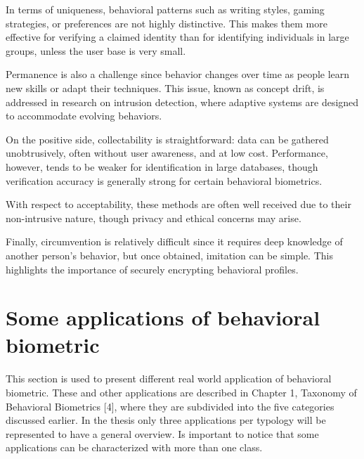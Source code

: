 \documentclass[12pt]{report}
\begin{document}
In terms of uniqueness, behavioral patterns such as writing styles, gaming strategies, or preferences are not highly distinctive.
This makes them more effective for verifying a claimed identity than for identifying individuals in large groups, unless the user base is very small.

Permanence is also a challenge since behavior changes over time as people learn new skills or adapt their techniques.
This issue, known as concept drift, is addressed in research on intrusion detection, where adaptive systems are designed to accommodate evolving behaviors.

On the positive side, collectability is straightforward: data can be gathered unobtrusively, often without user awareness, and at low cost. 
Performance, however, tends to be weaker for identification in large databases, though verification accuracy is generally strong for certain behavioral biometrics.

With respect to acceptability, these methods are often well received due to their non-intrusive nature, though privacy and ethical concerns may arise. 

Finally, circumvention is relatively difficult since it requires deep knowledge of another person's behavior, but once obtained, imitation can be simple.
This highlights the importance of securely encrypting behavioral profiles.

\section{Some applications of behavioral biometric}

This section is used to present different real world application of behavioral biometric.
These and other applications are described in Chapter 1, Taxonomy of Behavioral Biometrics [4], where they are subdivided into the five categories discussed earlier.
In the thesis only three applications per typology will be represented to have a general overview. 
Is important to notice that some applications can be characterized with more than one class.
\end{document}
